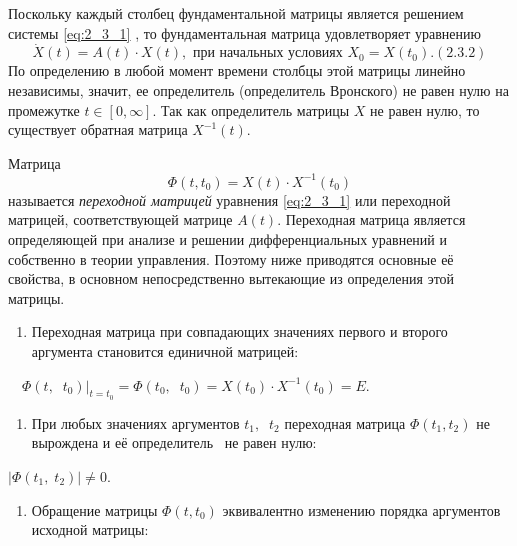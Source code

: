 		Поскольку каждый столбец фундаментальной матрицы является решением системы \eqref{eq:2_3_1}%
		, то фундаментальная матрица
		удовлетворяет уравнению
\begin{equation}\label{eq:2_3_2}
		\dot X(t)=A(t)\cdot X(t), \text{ при начальных условиях }  X_0=X(t_0). (2.3.2)
\end{equation}
		По определению в любой момент времени столбцы этой матрицы линейно независимы, значит, ее определитель (определитель
		Вронского) не равен нулю на промежутке  $t\in [0,\infty ]$. Так как определитель матрицы  $X$ не равен нулю, то
		существует обратная матрица  $X^{-1}(t)$.


		Матрица
	\begin{equation}\label{eq:2_3_3}
	\Phi (t,t_0)=X(t)\cdot X^{-1}(t_0) 
	\end{equation}
		называется \textit{переходной матрицей} уравнения \eqref{eq:2_3_1} %
		 или переходной матрицей, соответствующей матрице  $A(t)$.
		Переходная матрица является определяющей при анализе и решении дифференциальных уравнений и собственно в теории
		управления. Поэтому ниже приводятся основные её свойства, в основном непосредственно вытекающие из определения этой
		матрицы.

\liststyleWWviiiNumxxvii
\begin{enumerate}
	\item 
			Переходная матрица при совпадающих значениях первого и второго аргумента становится единичной матрицей:
	
\end{enumerate}
		\ \  $\Phi (t,\;\;t_0)|_{t=t_0}=\Phi (t_0,\;\;t_0)=X(t_0)\cdot X^{-1}(t_0)=E$.


\liststyleWWviiiNumxxvii
\setcounter{saveenum}{\value{enumi}}
\begin{enumerate}
	\setcounter{enumi}{\value{saveenum}}
	\item 
			При любых значениях аргументов  $t_1,\;\;t_2$ переходная матрица  $\Phi (t_1,t_2)$ не вырождена и её определитель \ не равен
			нулю:
	
\end{enumerate}

		   $|\Phi (t_1,\;t_2)|\neq 0$.

\liststyleWWviiiNumxxvii
\setcounter{saveenum}{\value{enumi}}
\begin{enumerate}
	\setcounter{enumi}{\value{saveenum}}
	\item 
			Обращение матрицы  $\Phi (t,t_0)$ эквивалентно изменению порядка аргументов исходной матрицы: 
	
\end{enumerate}


